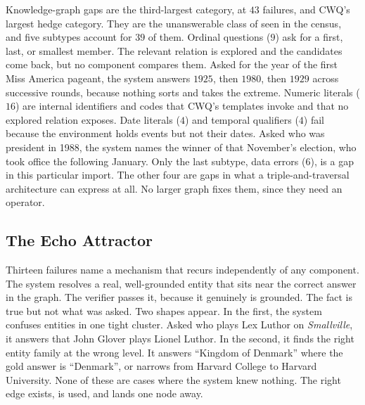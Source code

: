 Knowledge-graph gaps are the third-largest category, at $43$ failures, and CWQ's
largest hedge category. They are the unanswerable class of  seen
in the census, and five subtypes account for $39$ of them. Ordinal questions
($9$) ask for a first, last, or smallest member. The relevant relation is
explored and the candidates come back, but no component compares them. Asked for
the year of the first Miss America pageant, the system answers $1925$, then
$1980$, then $1929$ across successive rounds, because nothing sorts and takes
the extreme. Numeric literals ($16$) are internal identifiers and codes that
CWQ's templates invoke and that no explored relation exposes. Date literals
($4$) and temporal qualifiers ($4$) fail because the environment holds events
but not their dates. Asked who was president in 1988, the system names the
winner of that November's election, who took office the following January. Only
the last subtype, data errors ($6$), is a gap in this particular import. The
other four are gaps in what a triple-and-traversal architecture can express at
all. No larger graph fixes them, since they need an operator.

\subsection{The Echo Attractor}\label{sec:echo}

Thirteen failures name a mechanism that recurs independently of any component.
The system resolves a real, well-grounded entity that sits near the correct
answer in the graph. The verifier passes it, because it genuinely is grounded.
The fact is true but not what was asked. Two shapes appear. In the first, the
system confuses entities in one tight cluster. Asked who plays Lex Luthor on
\emph{Smallville}, it answers that John Glover plays Lionel Luthor. In the
second, it finds the right entity family at the wrong level. It answers
``Kingdom of Denmark'' where the gold answer is ``Denmark'', or narrows from
Harvard College to Harvard University. None of these are cases where the system
knew nothing. The right edge exists, is used, and lands one node away.

